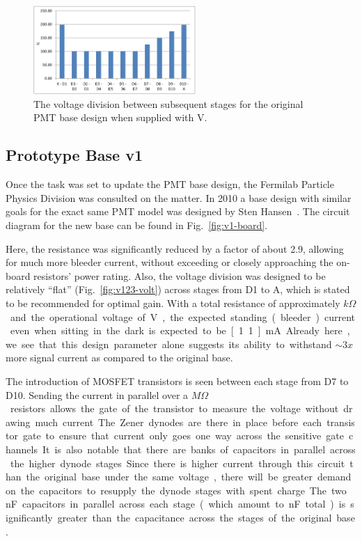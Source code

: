 \begin{figure}
	\centerline{
		\mbox{\includegraphics[width=0.55\textwidth]{figures/original-volt.jpg}}
	}
	\caption{The voltage division between subsequent stages for the original PMT base design when supplied with \unit[-1500]{V}.}
	\label{fig:original-volt}
\end{figure}

\subsection{Prototype Base v1}

Once the task was set to update the PMT base design, the Fermilab Particle Physics Division was consulted on the matter. In 2010 a base design with similar goals for the exact same PMT model was designed by Sten Hansen~\cite{pc:sten}. The circuit diagram for the new base can be found in Fig.~\ref{fig:v1-board}.

Here, the resistance was significantly reduced by a factor of about 2.9, allowing for much more bleeder current, without exceeding or closely approaching the on-board resistors' power rating. Also, the voltage division was designed to be relatively ``flat'' (Fig.~\ref{fig:v123-volt}) across stages from D1 to A, which is stated to be recommended for optimal gain. With a total resistance of approximately \unit[1365]{$k\Omega$} and the operational voltage of \unit[-1500]{V}, the expected standing (bleeder) current even when sitting in the dark is expected to be \unit[1.1]{mA}. Already here, we see that this design parameter alone suggests its ability to withstand $\sim 3x$ more signal current as compared to the original base.

The introduction of MOSFET transistors is seen between each stage from D7 to D10. Sending the current in parallel over a \unit[1]{$M\Omega$} resistors allows the gate of the transistor to measure the voltage without drawing much current. The Zener dynodes are there in place before each transistor gate to ensure that current only goes one way across the sensitive gate channels.

It is also notable that there are banks of capacitors in parallel across the higher dynode stages. Since there is higher current through this circuit than the original base under the same voltage, there will be greater demand on the capacitors to resupply the dynode stages with spent charge. The two \unit[10]{nF} capacitors in parallel across each stage (which amount to \unit[20]{nF} total) is significantly greater than the capacitance across the stages of the original base.

